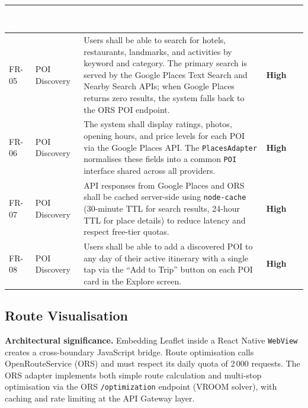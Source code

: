 \documentclass[12pt, a4paper]{article}
\newcommand{\reqid}[1]{\textsc{\small #1}}
\newcommand{\high}{\textbf{High}}
\newcommand{\thcell}[1]{\textcolor{white}{\textbf{\small #1}}}
\begin{document}
\vspace{0.4em}
\begin{longtable}{C{1.6cm} C{2.0cm} L{8.2cm} C{1.8cm}}
\toprule
{}
\thcell{Req ID} & \thcell{Category} & \thcell{Requirement} & \thcell{Priority} \\
\midrule
\endhead
\bottomrule
\endfoot

\reqid{FR-05} & POI Discovery &
Users shall be able to search for hotels, restaurants, landmarks, and activities by keyword and category. The primary search is served by the Google Places Text Search and Nearby Search APIs; when Google Places returns zero results, the system falls back to the ORS POI endpoint. &
\high \\

\reqid{FR-06} & POI Discovery &
The system shall display ratings, photos, opening hours, and price levels for each POI via the Google Places API. The \texttt{PlacesAdapter} normalises these fields into a common \texttt{POI} interface shared across all providers. &
\high \\

\reqid{FR-07} & POI Discovery &
API responses from Google Places and ORS shall be cached server-side using \texttt{node-cache} (30-minute TTL for search results, 24-hour TTL for place details) to reduce latency and respect free-tier quotas. &
\high \\

\reqid{FR-08} & POI Discovery &
Users shall be able to add a discovered POI to any day of their active itinerary with a single tap via the ``Add to Trip'' button on each POI card in the Explore screen. &
\high \\

\end{longtable}

\subsection{Route Visualisation}

\begin{tcolorbox}[notebox]
  \textbf{Architectural significance.} Embedding Leaflet inside a React Native \texttt{WebView} creates a cross-boundary JavaScript bridge. Route optimisation calls OpenRouteService (ORS) and must respect its daily quota of 2\,000 requests. The ORS adapter implements both simple route calculation and multi-stop optimisation via the ORS \texttt{/optimization} endpoint (VROOM solver), with caching and rate limiting at the API Gateway layer.
\end{tcolorbox}
\end{document}
